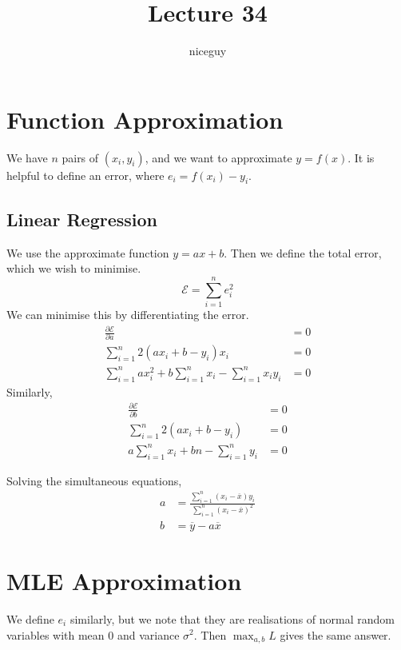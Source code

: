 \documentclass[12pt]{article}
\author{niceguy}
\title{Lecture 34}
\begin{document}
\maketitle

\section{Function Approximation}

We have $n$ pairs of $(x_i,y_i)$, and we want to approximate $y=f(x)$. It is helpful to define an error, where $e_i = f(x_i)-y_i$.

\subsection{Linear Regression}
We use the approximate function $y=ax+b$. Then we define the total error, which we wish to minimise.
$$\mathcal E = \sum_{i=1}^n e_i^2$$
We can minimise this by differentiating the error.
\begin{align*}
    \frac{\partial\mathcal E}{\partial a} &= 0 \\
    \sum_{i=1}^n 2(ax_i+b-y_i)x_i &= 0 \\
    \sum_{i=1}^n ax_i^2 + b\sum_{i=1}^n x_i - \sum_{i=1}^n x_iy_i &= 0
\end{align*}
Similarly,
\begin{align*}
    \frac{\partial\mathcal E}{\partial b} &= 0 \\
    \sum_{i=1}^n 2(ax_i+b-y_i) &= 0 \\
    a\sum_{i=1}^n x_i + bn - \sum_{i=1}^n y_i &= 0
\end{align*}

Solving the simultaneous equations,
\begin{align*}
    a &= \frac{\sum_{i=1}^n (x_i-\overline x)y_i}{\sum_{i=1}^n (x_i-\overline x)^2} \\
    b &= \overline y - a\overline x
\end{align*}

\section{MLE Approximation}

We define $e_i$ similarly, but we note that they are realisations of normal random variables with mean 0 and variance $\sigma^2$. Then $\max_{a,b}L$ gives the same answer.
\end{document}
